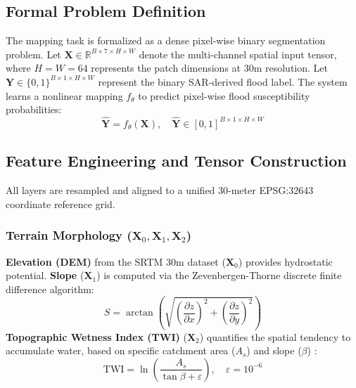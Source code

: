 \documentclass[conference]{IEEEtran}
\begin{document}
\subsection{Formal Problem Definition}
The mapping task is formalized as a dense pixel-wise binary segmentation problem. Let $\mathbf{X} \in \mathbb{R}^{B \times 7 \times H \times W}$ denote the multi-channel spatial input tensor, where $H=W=64$ represents the patch dimensions at 30m resolution. Let $\mathbf{Y} \in \{0,1\}^{B \times 1 \times H \times W}$ represent the binary SAR-derived flood label. The system learns a nonlinear mapping $f_\theta$ to predict pixel-wise flood susceptibility probabilities:
\begin{equation}
\hat{\mathbf{Y}} = f_\theta(\mathbf{X}), \quad \hat{\mathbf{Y}} \in [0,1]^{B \times 1 \times H \times W}
\end{equation}

\subsection{Feature Engineering and Tensor Construction}
All layers are resampled and aligned to a unified 30-meter EPSG:32643 coordinate reference grid.

\subsubsection{Terrain Morphology ($\mathbf{X}_0, \mathbf{X}_1, \mathbf{X}_2$)}
\textbf{Elevation (DEM)} from the SRTM 30m dataset ($\mathbf{X}_0$) provides hydrostatic potential.
\textbf{Slope} ($\mathbf{X}_1$) is computed via the Zevenbergen-Thorne discrete finite difference algorithm:
\begin{equation}
S = \arctan\left(\sqrt{\left(\frac{\partial z}{\partial x}\right)^2 + \left(\frac{\partial z}{\partial y}\right)^2}\right)
\end{equation}
\textbf{Topographic Wetness Index (TWI)} ($\mathbf{X}_2$) quantifies the spatial tendency to accumulate water, based on specific catchment area ($A_s$) and slope ($\beta$) \cite{15}:
\begin{equation}
\text{TWI} = \ln\left(\frac{A_s}{\tan \beta + \varepsilon}\right), \quad \varepsilon = 10^{-6}
\end{equation}
\end{document}
